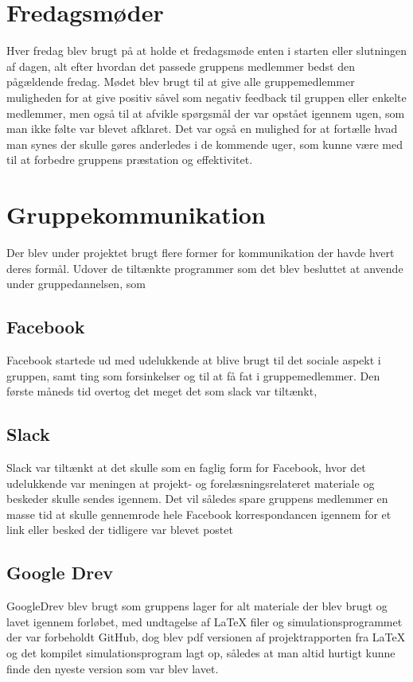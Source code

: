 \section{Fredagsmøder}\label{Fredagsmoeder}
Hver fredag blev brugt på at holde et fredagsmøde enten i starten eller slutningen af dagen, alt efter hvordan det passede gruppens medlemmer bedst den pågældende fredag. Mødet blev brugt til at give alle gruppemedlemmer muligheden for at give positiv såvel som negativ feedback til gruppen eller enkelte medlemmer, men også til at afvikle spørgsmål der var opstået igennem ugen, som man ikke følte var blevet afklaret. Det var også en mulighed for at fortælle hvad man synes der skulle gøres anderledes i de kommende uger, som kunne være med til at forbedre gruppens præstation og effektivitet.

\section{Gruppekommunikation}\label{Gruppekommunikation}
Der blev under projektet brugt flere former for kommunikation der havde hvert deres formål. Udover de tiltænkte programmer som det blev besluttet at anvende under gruppedannelsen, som 

\subsection{Facebook}\label{Facebook}
Facebook startede ud med udelukkende at blive brugt til det sociale aspekt i gruppen, samt ting som forsinkelser og til at få fat i gruppemedlemmer. Den første måneds tid overtog det meget det som slack var tiltænkt,  

\subsection{Slack}\label{Slack}
Slack var tiltænkt at det skulle som en faglig form for Facebook, hvor det udelukkende var meningen at projekt- og forelæsningsrelateret materiale og beskeder skulle sendes igennem. Det vil således spare gruppens medlemmer en masse tid at skulle gennemrode hele Facebook korrespondancen igennem for et link eller besked der tidligere var blevet postet   

\subsection{Google Drev}\label{GoogleDrev}
GoogleDrev blev brugt som gruppens lager for alt materiale der blev brugt og lavet igennem forløbet, med undtagelse af LaTeX filer og simulationsprogrammet der var forbeholdt GitHub, dog blev pdf versionen af projektrapporten fra LaTeX og det kompilet simulationsprogram lagt op, således at man altid hurtigt kunne finde den nyeste version som var blev lavet.   

